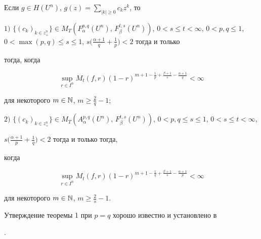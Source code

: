 \begin{thm} 


Если $g\in H(U^n)$, $g(z)=\sum\limits_{|k|\ge0}c_k z^k$, то 


 


$1)$ $\{(c_k)_{k\in z^n_+}\}\in M_T(F^{p,q}_\alpha(U^n),\, 


F^{t,s}_\beta(U^n))$, $0<s\le t<\infty$, $0<p,q\le1$, $0<\max(p,q)\le 


s\le1$, $s\big(\frac{\alpha+1}{q}+\frac{1}{p}\big)<2$ тогда и только 


тогда, когда 


\begin{equation} 


\sup_{r\in I^n}M_t(f,r) 


(1-r)^{m+1-\frac{1}{p}+\frac{\beta+1}{s}-\frac{\alpha+1}{q}}<\infty 


\end{equation} 


для некоторого $m\in\Bbb N$, $m\ge\frac{2}{q}-1;$ 


 


$2)$ $\{(c_k)_{k\in z^n_+}\}\in M_T(A^{p,q}_\alpha(U^n),\, 


F^{t,s}_\beta(U^n))$, $0<p,q\le s\le1$, $0<s\le t<\infty$, 


$s\big(\frac{\alpha+1}{p}+\frac{1}{q}\big)<2$ тогда и только тогда, 


когда 


\begin{equation} 


\sup_{r\in I^n}M_t(f,r) 


(1-r)^{m+1-\frac{1}{q}+\frac{\beta+1}{s}-\frac{\alpha+1}{p}}<\infty 


\end{equation} 


для некоторого $m\in\Bbb N$, $m\ge\frac{2}{s}-1$. 


\end{thm} 


 


\begin{notenonum} 


Утверждение теоремы 1 при $p=q$ хорошо известно и установлено в 


\cite{1}. 


\end{notenonum} 


